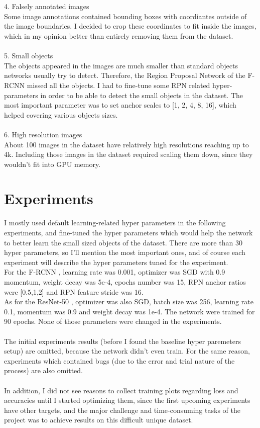 \documentclass[]{article}
\begin{document}
\\\\
4. Falsely annotated images\\
Some image annotations contained bounding boxes with coordiantes outside of the image boundaries. I decided to crop these coordinates to fit inside the images, which in my opinion better than entirely removing them from the dataset.
\\\\
5. Small objects\\
The objects appeared in the images are much smaller than standard objects networks usually try to detect. Therefore, the Region Proposal Network of the F-RCNN \cite{fasterrcnn} missed all the objects. I had to fine-tune some RPN related hyper-parameters in order to be able to detect the small objects in the dataset. The most important parameter was to set anchor scales to [1, 2, 4, 8, 16], which helped covering various objects sizes.
\\\\
6. High resolution images\\
About 100 images in the dataset have relatively high resolutions reaching up to 4k. Including those images in the dataset required scaling them down, since they wouldn't fit into GPU memory.

\section{Experiments}
I mostly used default learning-related hyper parameters in the following experiments, and fine-tuned the hyper parameters which would help the network to better learn the small sized objects of the dataset. There are more than 30 hyper parameters, so I'll mention the most important ones, and of course each experiment will describe the hyper parameters tuned for the experiment.\\
For the F-RCNN \cite{fasterrcnn}, learning rate was 0.001, optimizer was SGD with 0.9 momentum, weight decay was 5e-4, epochs number was 15, RPN anchor ratios were [0.5,1,2] and RPN feature stride was 16.\\
As for the ResNet-50 \cite{resnet}, optimizer was also SGD, batch size was 256, learning rate 0.1, momentum was 0.9 and weight decay was 1e-4. The network were trained for 90 epochs. None of those parameters were changed in the experiments.
\\\\
The initial experiments results (before I found the baseline hyper paremeters setup) are omitted, because the network didn't even train. For the same reason, experiments which contained bugs (due to the error and trial nature of the process) are also omitted.
\\\\
In addition, I did not see reasons to collect training plots regarding loss and accuracies until I started optimizing them, since the first upcoming experiments have other targets, and the major challenge and time-consuming tasks of the project was to achieve results on this difficult unique dataset.
\end{document}
